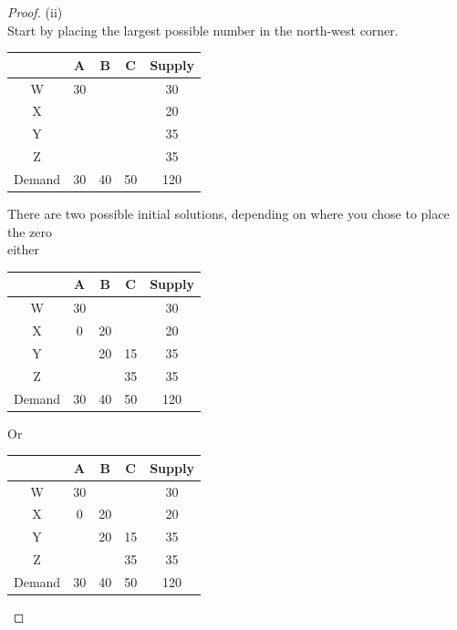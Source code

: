 \documentclass[a4paper]{article}
\begin{document}
\begin{eg}
\begin{proof}
		(ii)\\
		Start by placing the largest possible number in the north-west corner.

		\begin{center}
			\begin{tabular}{|c|c|c|c|c|}
				\hline
				       & A  & B  & C  & Supply \\
				\hline
				W      & 30 &    &    & 30     \\
				\hline
				X      &    &    &    & 20     \\
				\hline
				Y      &    &    &    & 35     \\
				\hline
				Z      &    &    &    & 35     \\
				\hline
				Demand & 30 & 40 & 50 & 120    \\
				\hline
			\end{tabular}
		\end{center}
		There are two possible initial solutions, depending on where you chose to place the zero\\

		either
		\begin{center}
			\begin{tabular}{|c|c|c|c|c|}
				\hline
				       & A  & B  & C  & Supply \\
				\hline
				W      & 30 &    &    & 30     \\
				\hline
				X      & 0  & 20 &    & 20     \\
				\hline
				Y      &    & 20 & 15 & 35     \\
				\hline
				Z      &    &    & 35 & 35     \\
				\hline
				Demand & 30 & 40 & 50 & 120    \\
				\hline
			\end{tabular}
		\end{center}
		Or
		\begin{center}
			\begin{tabular}{|c|c|c|c|c|}
				\hline
				       & A  & B  & C  & Supply \\
				\hline
				W      & 30 &    &    & 30     \\
				\hline
				X      & 0  & 20 &    & 20     \\
				\hline
				Y      &    & 20 & 15 & 35     \\
				\hline
				Z      &    &    & 35 & 35     \\
				\hline
				Demand & 30 & 40 & 50 & 120    \\
				\hline
			\end{tabular}
		\end{center}
	\end{proof}
\end{eg}
\end{document}
